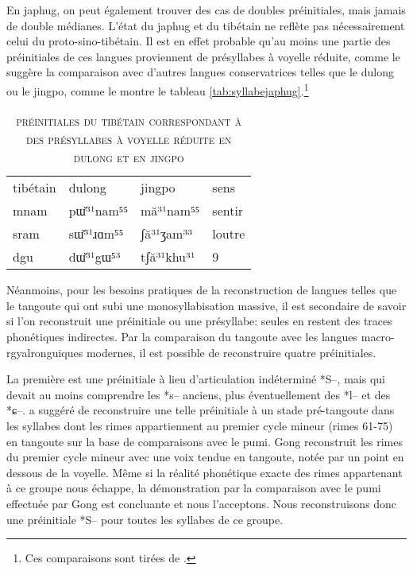 \documentclass[oldfontcommands,twoside,a4paper,11pt,draft]{memoir}
\newcommand{\ipa}[1]{{\phon #1}} %
\newcommand{\ipapl}[1]{{\phondroit #1}}
\newcommand{\captionb}[1]{\caption{\textsc{#1}}}
\begin{document}
En japhug, on peut également trouver des cas de doubles préinitiales, mais jamais de double médianes.
L'état du japhug et du tibétain ne reflète pas nécessairement celui du proto-sino-tibétain. Il est en effet probable qu'au moins une partie des préinitiales de ces langues proviennent de présyllabes à voyelle réduite, comme le suggère la comparaison avec d'autres langues conservatrices telles que le dulong ou le jingpo, comme le montre le tableau \ref{tab:syllabejaphug}.\footnote{Ces comparaisons sont tirées de \citealt[64]{dai90zangmian}.} 

\begin{table}
\captionb{préinitiales du tibétain correspondant à des présyllabes à voyelle réduite en dulong et en jingpo}\label{tab:preinitialesjaphug}
\begin{tabular}{llll} 
	tibétain	&	dulong	&	jingpo	&	sens	\\	
\ipa{	mnam}	&	\ipa{pɯ̆³¹nam⁵⁵}	&	\ipa{mă³¹nam⁵⁵	}&	sentir	\\	
\ipa{	sram}	&	\ipa{sɯ̆³¹ɹɑm⁵⁵}	&	\ipa{ʃă³¹ʒam³³	}&	loutre	\\	
\ipa{	dgu}	&	\ipa{dɯ̆³¹gɯ⁵³}	&	\ipa{tʃă³¹khu³¹	}&	9	\\	
\end{tabular}
\end{table}

Néanmoins, pour les besoins pratiques de la reconstruction de langues telles que le tangoute qui ont subi une monosyllabisation massive, il est secondaire de savoir si l'on reconstruit une préinitiale ou une présyllabe: seules en restent des traces phonétiques indirectes. Par la comparaison du tangoute avec les langues macro-rgyalronguiques modernes, il est possible de reconstruire quatre préinitiales. 

La première est une préinitiale à lieu d'articulation indéterminé *S--, mais qui devait au moins comprendre les *s-- anciens, plus éventuellement des *l-- et des *\ipapl{ɕ--}. \citet{gong99jinyuanyin} a suggéré de reconstruire une telle préinitiale  à un stade pré-tangoute dans les syllabes dont les rimes appartiennent au premier cycle mineur (rimes 61-75) en tangoute sur la base de comparaisons avec le pumi. Gong reconstruit les rimes du premier cycle mineur avec une voix tendue en tangoute, notée par un point en dessous de la voyelle. Même si la réalité phonétique exacte des rimes appartenant à ce groupe nous échappe, la démonstration par la comparaison avec le pumi effectuée par Gong est concluante et nous l'acceptons. Nous reconstruisons donc une préinitiale *S-- pour toutes les syllabes de ce groupe.
\end{document}
